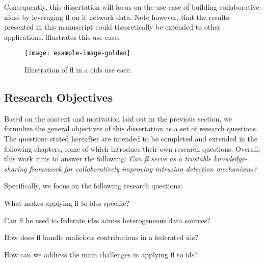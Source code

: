 Consequently, this dissertation will focus on the use case of building collaborative \glspl{nids} by leveraging \gls{fl} on \gls{it} network data.
Note however, that the results presented in this manuscript could theoretically be extended to other applications.
 illustrates this use case.

\begin{figure}
  \centering
  \texttt{[image: example-image-golden]}
  \caption{Illustration of \gls{fl} in a \gls{cids} use case.}
  \label{fig:intro.usecase}
\end{figure}

\subsection{Research Objectives\label{sec:intro.questions}}

Based on the context and motivation laid out in the previous section, we formulize the general objectives of this dissertation as a set of research questions.
The questions stated hereafter are intended to be completed and extended in the following chapters, some of which introduce their own research questions.
Overall, this work aims to answer the following: \emph{Can \gls{fl} serve as a trustable knowledge-sharing framework for collaboratively improving intrusion detection mechanisms?}

Specifically, we focus on the following research questions:

\begin{questions}
  \item What makes applying \gls{fl} to \glspl{ids} specific? \label{rq:intro.fids}
  \item Can \gls{fl} be used to federate \glspl{ids} across heterogeneous data sources? \label{rq:intro.heterogeneity}
  \item How does \gls{fl} handle malicious contributions in a federated \gls{ids}? \label{rq:intro.malicious}
  \item How can we address the main challenges in applying \gls{fl} to \gls{ids}? \label{rq:intro.propositions}
\end{questions}


